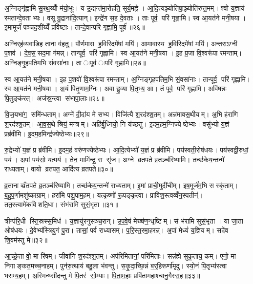 अ॒ग्निङ्गृ॑ह्णामि सु॒रथ॒य्योँ म॑यो॒भूः। य उ॒द्यन्त॑मा॒रोह॑ति॒ सूर्य॒मह्ने। आ॒दि॒त्यञ्ज्योति॑षा॒ञ्ज्योति॑रुत्त॒मम्। श्वो य॒ज्ञाय॑ रमतान्दे॒वताभ्यः। वसून्रु॒द्राना॑दि॒त्यान्। इन्द्रे॑ण स॒ह दे॒वताः। ताः पूर्व॒ परि॑ गृह्णामि। स्व आ॒यत॑ने मनी॒षया। इ॒मामूर्जं॑ पञ्चद॒शींय्येँ प्रवि॑ष्टाः। तान्दे॒वान्परि॑ गृह्णामि॒ पूर्व॑॥२६॥

अ॒ग्निर्‌ह॑व्य॒वाडि॒ह ताना व॑हतु। पौ॒र्णमा॒स ह॒विरि॒दमे॑षां॒ मयि॑। आ॒मा॒वा॒स्य ह॒विरि॒दमे॑षां॒ मयि॑। अ॒न्त॒राऽग्नी प॒शव॑। दे॒व॒स॒सद॒मा ग॑मन्न्। तान्पूर्व॒ परि॑ गृह्णामि। स्व आ॒यत॑ने मनी॒षया। इ॒ह प्र॒जा वि॒श्वरू॑पा रमन्ताम्। अ॒ग्निङ्गृ॒हप॑तिम॒भि सं॒वसा॑नाः। ता ःपूर्व॒ ःपरि॑ गृह्णामि॥२७॥

स्व आ॒यत॑ने मनी॒षया। इ॒ह प॒शवो॑ वि॒श्वरू॑पा रमन्ताम्। अ॒ग्निङ्गृ॒हप॑तिम॒भि सं॒वसा॑नाः। तान्पूर्व॒ परि॑ गृह्णामि। स्व आ॒यत॑ने मनी॒षया। अ॒यं पि॑तृ॒णाम॒ग्निः। अवाड्ढ॒व्या पि॒तृभ्य॒ आ। तं पूर्व॒ परि॑ गृह्णामि। अवि॑षन्नः पि॒तुङ्क॑रत्। अज॑स्र॒न्त्वा स॑भापा॒लाः॥२८॥

वि॒ज॒यभा॑ग॒ समि॑न्धताम्। अग्ने॑ दी॒दा॑य मे सभ्य। विजि॑त्यै श॒रद॑श्श॒तम्। अन्न॑मावस॒थीयम्। अ॒भि ह॑राणि श॒रद॑श्श॒तम्। आ॒व॒स॒थे श्रियं॒ मन्त्रम्। अहि॑र्बु॒ध्नियो॒ नि य॑च्छतु। इ॒दम॒हम॒ग्निज्येष्ठेभ्यः। वसु॑भ्यो य॒ज्ञं प्रब्र॑वीमि। इ॒दम॒हमिन्द्र॑ज्येष्ठेभ्यः॥२९॥

रु॒द्रेभ्यो॑ य॒ज्ञं प्र ब्र॑वीमि। इ॒दम॒हं वरु॑णज्येष्ठेभ्यः। आ॒दि॒त्येभ्यो॑ य॒ज्ञं प्र ब्र॑वीमि। पय॑स्वती॒रोष॑धयः। पय॑स्वद्वी॒रुधां॒ पय॑। अ॒पां पय॑सो॒ यत्पय॑। तेन॒ मामि॑न्द्र॒ स सृ॑ज। अग्ने व्रतपते व्र॒तञ्च॑रिष्यामि। तच्छ॑केय॒न्तन्मे॑ राध्यताम्। वायो व्रतपत॒ आदि॑त्य व्रतपते॥३०॥

व्र॒तानाव्व्रँतपते व्र॒तञ्च॑रिष्यामि। तच्छ॑केय॒न्तन्मे॑ राध्यताम्। इ॒मां प्राची॒मुदी॑चीम्। इष॒मूर्ज॑म॒भि सस्कृ॑ताम्। ब॒हु॒प॒र्णामशु॑ष्काग्राम्। हरा॑मि पशु॒पाम॒हम्। यत्कृष्णो॑ रू॒पङ्कृ॒त्वा। प्रावि॑श॒स्त्वव्वँन॒स्पतीन्॑। तत॒स्त्वामे॑कविशति॒धा। संभ॑रामि सुसं॒भृता॥३१॥

त्रीन्प॑रि॒धी स्ति॒स्रस्स॒मिध॑। य॒ज्ञायु॑रनुसञ्च॒रान्। उ॒प॒वे॒षं मेख्ष॑ण॒न्धृष्टिम्। सं भ॑रामि सुसं॒भृता। या जा॒ता ओष॑धयः। दे॒वेभ्य॑स्त्रियु॒गं पु॒रा। तासां॒ पर्व॑ राध्यासम्। प॒रि॒स्त॒रमा॒हरन्न्॑॑। अ॒पां मेध्यं॑ य॒ज्ञियम्। सदे॑व शि॒वम॑स्तु मे॥३२॥

आ॒च्छे॒त्ता वो॒ मा रि॑षम्। जीवा॑नि श॒रद॑श्श॒तम्। अप॑रिमितानां॒ परि॑मिताः। सन्न॑ह्ये सुकृ॒ताय॒ कम्। एनो॒ मा निगाङ्कत॒मच्च॒नाहम्। पुन॑रु॒त्थाय॑ बहु॒ला भ॑वन्तु। स॒कृ॒दा॒च्छि॒न्नं ब॒र्॒हिरूर्णा॑मृदु। स्यो॒नं पि॒तृभ्य॑स्त्वा भराम्य॒हम्। अ॒स्मिन्थ्सी॑दन्तु मे पि॒तर॑ सो॒म्याः। पि॒ता॒म॒हाः प्रपि॑तामहाश्चानु॒गैस्स॒ह॥३३॥

